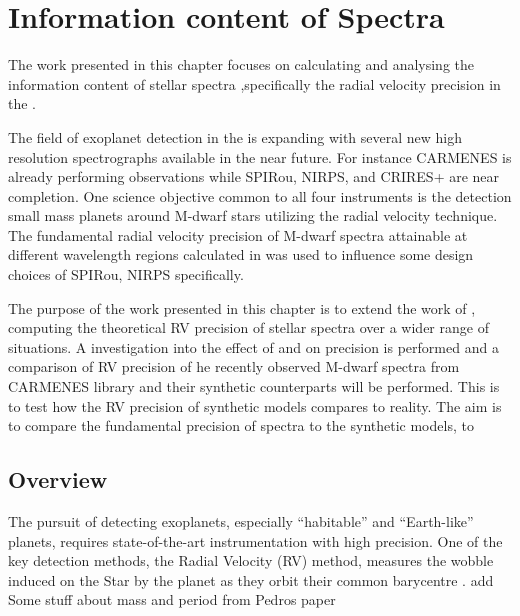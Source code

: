 
\chapter{Information content of \nir{} Spectra}
\label{cha:nir_content}

The work presented in this chapter focuses on calculating and analysing the information content of stellar spectra ,specifically the radial velocity precision in the \nir{}.  

The field of exoplanet detection in the \nir{} is expanding with several new high resolution \nir{} spectrographs available in the near future. For instance {CARMENES} is already performing observations while SPIRou, {NIRPS}, and CRIRES+ are near completion. One science objective common to all four instruments is the detection small mass planets around {M-dwarf} stars utilizing the radial velocity technique. 
The fundamental radial velocity precision of {M-dwarf} spectra attainable at different wavelength regions calculated in \citet{figueira_radial_2016} was used to influence some design choices of SPIRou, {NIRPS} specifically. 

The purpose of the work presented in this chapter is to extend the work of \citet{figueira_radial_2016}, computing the theoretical RV precision of stellar spectra over a wider range of situations. A investigation into the effect of \logg{} and \feh{} on precision is performed and a comparison of RV precision of he recently observed \nir{} {M-dwarf} spectra from {CARMENES} library and their synthetic counterparts will be performed. This is to test how the {RV} precision of synthetic models compares to reality.
The aim is to compare the fundamental precision of \nir{} spectra to the synthetic models, to 


\section{Overview}

The pursuit of detecting exoplanets, especially ``habitable'' and ``Earth-like'' planets, requires state-of-the-art instrumentation with high precision. One of the key detection methods, the Radial Velocity ({RV}) method, measures the wobble induced on the Star by the planet as they orbit their common barycentre .  {\red{} add Some stuff about mass and period from Pedros paper}  



